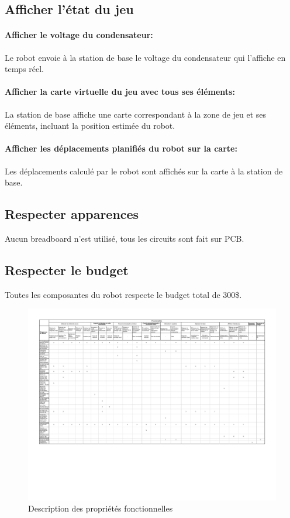 \subsection{Afficher l'état du jeu}

\paragraph{Afficher le voltage du condensateur:}
Le robot envoie à la station de base le voltage du condensateur qui l'affiche en temps réel.

\paragraph{Afficher la carte virtuelle du jeu avec tous ses éléments:}
La station de base affiche une carte correspondant à la zone de jeu et ses éléments, incluant la position estimée du robot.

\paragraph{Afficher les déplacements planifiés du robot sur la carte:}
Les déplacements calculé par le robot sont affichés sur la carte à la station de base.

\subsection{Respecter apparences}
Aucun breadboard n'est utilisé, tous les circuits sont fait sur PCB.

\subsection{Respecter le budget}
Toutes les composantes du robot respecte le budget total de 300\$.


\begin{landscape}
  \begin{center}
    \begin{figure}[h]
      \caption{Description des propriétés fonctionnelles}
      \label{fig:dpf}
      \centering
      \includegraphics[scale=0.85]{resources/dpf.pdf}
    \end{figure}
  \end{center}
\end{landscape}
